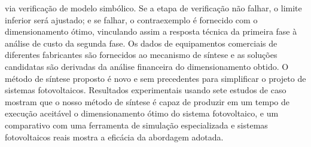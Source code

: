 via verificação de modelo simbólico. Se a etapa de verificação não falhar, o limite inferior será ajustado; e se falhar, o contraexemplo é fornecido com o dimensionamento ótimo, vinculando assim a resposta técnica da primeira fase à análise de custo da segunda fase. Os dados de equipamentos comerciais de diferentes fabricantes são fornecidos ao mecanismo de síntese e as soluções candidatas são derivadas da análise financeira do dimensionamento obtido. O método de síntese proposto é novo e sem precedentes para simplificar o projeto de sistemas fotovoltaicos. Resultados experimentais usando sete estudos de caso mostram que o nosso método de síntese é capaz de produzir em um tempo de execução aceitável o dimensionamento ótimo do sistema fotovoltaico, e um comparativo com uma ferramenta de simulação especializada e sistemas fotovoltaicos reais mostra a eficácia da abordagem adotada.
